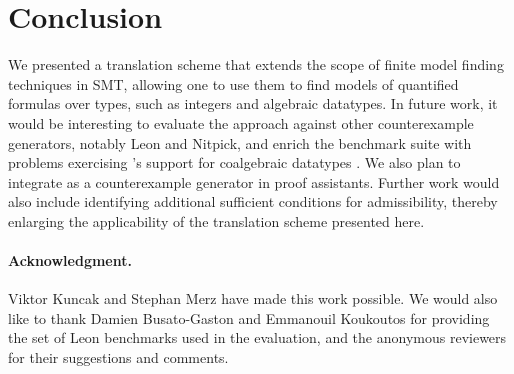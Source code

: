 


%
%
%

\section{Conclusion}
\label{sec:conclusion}

We presented a translation scheme that extends the scope of finite model finding 
techniques in SMT, allowing one to use them to find models of quantified formulas 
over  types, such as integers and algebraic datatypes.
%
In future work, it would be interesting to evaluate the approach against other
counterexample generators, notably Leon and Nitpick, and enrich the benchmark
suite with problems exercising \cvc's support for coalgebraic datatypes
\cite{reynolds-blanchette-2015-codata}. We also plan to integrate \cvc as a
counterexample generator in proof assistants. Further work would also
include identifying additional sufficient conditions for admissibility, thereby
enlarging the applicability of the translation scheme presented here.


{%
\def\ackname{Acknowledgment}
\paragraph{%
\ackname.}
Viktor Kuncak and Stephan Merz have made this work possible. We would also like
to thank Damien Busato-Gaston and Emmanouil Koukoutos for providing the
set of Leon benchmarks used in the evaluation, and the anonymous reviewers for their
suggestions and comments.
}
%

{


}


